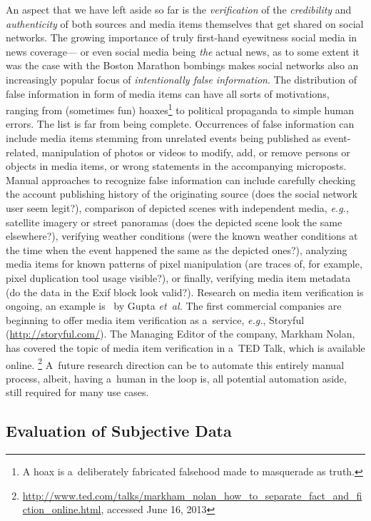 An aspect that we have left aside so far is the \emph{verification}
of the \emph{credibility} and \emph{authenticity} of both sources
and media items themselves that get shared on social networks.
The growing importance of truly first-hand eyewitness social media in news coverage---%
or even social media being \emph{the} actual news,
as to some extent it was the case with the Boston Marathon bombings
makes social networks also an increasingly popular focus of \emph{intentionally false information}.
The distribution of false information in form of media items
can have all sorts of motivations, ranging from (sometimes fun)
hoaxes\footnote{A hoax is a~deliberately fabricated falsehood made to masquerade as truth.}
to political propaganda to simple human errors.
The list is far from being complete.
Occurrences of false information can include
media items stemming from unrelated events being published as event-related,
manipulation  of photos or videos to modify, add, or remove persons or objects in media items,
or wrong statements in the accompanying microposts.
Manual approaches to recognize false information 
can include carefully checking the account publishing history
of the originating source (does the social network user seem legit?),
comparison of depicted scenes with independent media,
\emph{e.g.}, satellite imagery or street panoramas
(does the depicted scene look the same elsewhere?),
verifying weather conditions
(were the known weather conditions at the time
when the event happened the same as the depicted ones?),
analyzing media items for known patterns of pixel manipulation
(are traces of, for example, pixel duplication tool usage visible?),
or finally, verifying media item metadata
(do the data in the Exif block look valid?).
Research on media item verification is ongoing,
an example is~\cite{gupta2013fakingsandy} by Gupta \emph{et~al.}
The first commercial companies are beginning to offer media item 
verification as a~service, \emph{e.g.}, Storyful (\url{http://storyful.com/}).
The Managing Editor of the company, Markham Nolan,
has covered the topic of media item verification
in a~TED Talk, which is available online.%
\footnote{\url{http://www.ted.com/talks/markham_nolan_how_to_separate_fact_and_fiction_online.html},
accessed June 16, 2013}
A~future research direction can be to automate
this entirely manual process, albeit, having a~human in the loop
is, all potential automation aside, still required for many use cases.

\subsection{Evaluation of Subjective Data}

